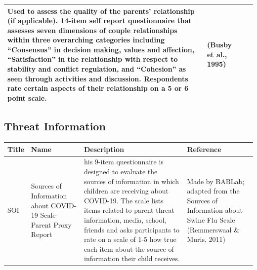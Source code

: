 \documentclass[]{book}
\begin{document}
\begin{longtable}[]{@{}llll@{}}
\begin{minipage}[t]{0.22\columnwidth}
Used to assess the quality of the parents' relationship (if applicable). 14-item self report questionnaire that assesses seven dimensions of couple relationships within three overarching categories including ``Consensus'' in decision making, values and affection, ``Satisfaction'' in the relationship with respect to stability and conflict regulation, and ``Cohesion'' as seen through activities and discussion. Respondents rate certain aspects of their relationship on a 5 or 6 point scale.\strut
\end{minipage} & \begin{minipage}[t]{0.18\columnwidth}\raggedright
(Busby et al., 1995)\strut
\end{minipage}\tabularnewline
\bottomrule
\end{longtable}

\hypertarget{threat-information}{%
\subsection{Threat Information}\label{threat-information}}

\begin{longtable}[]{@{}llll@{}}
\toprule
\begin{minipage}[b]{0.22\columnwidth}\raggedright
Title\strut
\end{minipage} & \begin{minipage}[b]{0.27\columnwidth}\raggedright
Name\strut
\end{minipage} & \begin{minipage}[b]{0.22\columnwidth}\raggedright
Description\strut
\end{minipage} & \begin{minipage}[b]{0.18\columnwidth}\raggedright
Reference\strut
\end{minipage}\tabularnewline
\midrule
\endhead
\begin{minipage}[t]{0.22\columnwidth}\raggedright
SOI\strut
\end{minipage} & \begin{minipage}[t]{0.27\columnwidth}\raggedright
Sources of Information about COVID-19 Scale- Parent Proxy Report\strut
\end{minipage} & \begin{minipage}[t]{0.22\columnwidth}\raggedright
his 9-item questionnaire is designed to evaluate the sources of information in which children are receiving about COVID-19. The scale lists items related to parent threat information, media, school, friends and asks participants to rate on a scale of 1-5 how true each item about the source of information their child receives.\strut
\end{minipage} & \begin{minipage}[t]{0.18\columnwidth}\raggedright
Made by BABLab; adapted from the Sources of Information about Swine Flu Scale (Remmerswaal \& Muris, 2011)\strut
\end{minipage}\tabularnewline
\bottomrule
\end{longtable}
\end{document}
